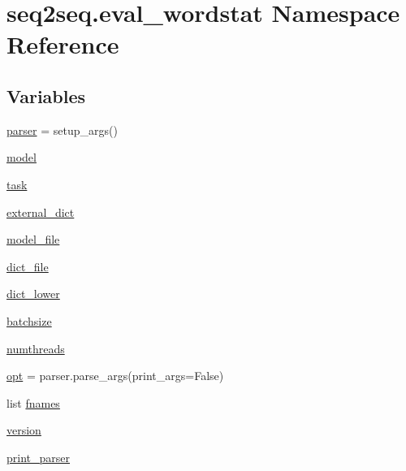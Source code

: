 \hypertarget{namespaceseq2seq_1_1eval__wordstat}{}\section{seq2seq.\+eval\+\_\+wordstat Namespace Reference}
\label{namespaceseq2seq_1_1eval__wordstat}
\subsection*{Variables}
\begin{DoxyCompactItemize}
\item 
\hyperlink{namespaceseq2seq_1_1eval__wordstat_a08ac33c3b3c9bae6a47eea63ae40ae01}{parser} = setup\+\_\+args()
\item 
\hyperlink{namespaceseq2seq_1_1eval__wordstat_a4e3a8ce76ade36dc6845da2e2882f227}{model}
\item 
\hyperlink{namespaceseq2seq_1_1eval__wordstat_ae7fc745ea4e185e8dea8552919f3e71d}{task}
\item 
\hyperlink{namespaceseq2seq_1_1eval__wordstat_a20f55c53fd6e2f7195256c802d912dae}{external\+\_\+dict}
\item 
\hyperlink{namespaceseq2seq_1_1eval__wordstat_a15cab2281a40a7122745f6b70951d548}{model\+\_\+file}
\item 
\hyperlink{namespaceseq2seq_1_1eval__wordstat_af36cddb86242c21e6ee4d8a5cd303d5e}{dict\+\_\+file}
\item 
\hyperlink{namespaceseq2seq_1_1eval__wordstat_a9c3103a4e7d60da4c81e3ae3c964c600}{dict\+\_\+lower}
\item 
\hyperlink{namespaceseq2seq_1_1eval__wordstat_a41a234e46292d9ae77aa431bd542ccbf}{batchsize}
\item 
\hyperlink{namespaceseq2seq_1_1eval__wordstat_a618bf6901e2f89ad7843af256b248cdd}{numthreads}
\item 
\hyperlink{namespaceseq2seq_1_1eval__wordstat_a38b14cace5d789154434b807b9e217d2}{opt} = parser.\+parse\+\_\+args(print\+\_\+args=False)
\item 
list \hyperlink{namespaceseq2seq_1_1eval__wordstat_a09388eb580d8195dfaa05fa4f33c6b57}{fnames}
\item 
\hyperlink{namespaceseq2seq_1_1eval__wordstat_ac0b00d1f99bfdadc0535936a7b9042eb}{version}
\item 
\hyperlink{namespaceseq2seq_1_1eval__wordstat_aed68902b90c301195f0157209afbaf0a}{print\+\_\+parser}
\end{DoxyCompactItemize}


